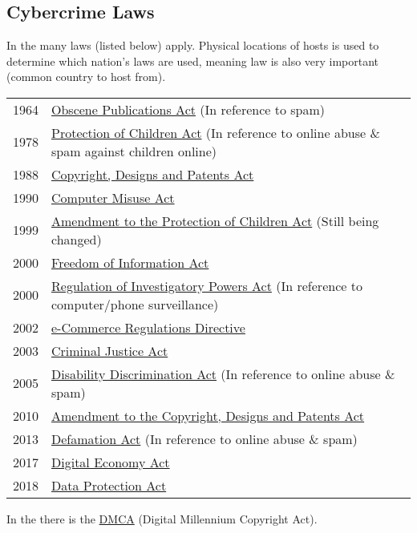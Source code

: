 \documentclass{report}
\begin{document}
        \subsection*{Cybercrime Laws}
            In the  many laws (listed below) apply. Physical locations of hosts is used to determine which nation's laws are used, meaning  law is also very important (common country to host from).
            \begin{center}
                \begin{tabular}{l l}
                    1964 & \href{https://www.legislation.gov.uk/ukpga/1964/74/contents}{Obscene Publications Act} (In reference to spam) \\
                    1978 & \href{https://www.legislation.gov.uk/ukpga/1978/37/contents}{Protection of Children Act} (In reference to online abuse \& spam against children online) \\
                    1988 & \href{https://www.legislation.gov.uk/ukpga/1988/48/contents}{Copyright, Designs and Patents Act} \\
                    1990 & \href{https://www.legislation.gov.uk/ukpga/1990/18/contents}{Computer Misuse Act} \\
                    1999 & \href{https://www.legislation.gov.uk/ukpga/1999/14/contents}{Amendment to the Protection of Children Act} (Still being changed) \\
                    2000 & \href{https://www.legislation.gov.uk/ukpga/2000/36/contents}{Freedom of Information Act} \\
                    2000 & \href{https://www.legislation.gov.uk/ukpga/2000/23/contents}{Regulation of Investigatory Powers Act} (In reference to computer/phone surveillance) \\
                    2002 & \href{https://www.legislation.gov.uk/uksi/2002/2013/made}{e-Commerce Regulations Directive} \\
                    2003 & \href{https://www.legislation.gov.uk/ukpga/2003/44/contents}{Criminal Justice Act} \\
                    2005 & \href{https://www.legislation.gov.uk/ukpga/2005/13/contents}{Disability Discrimination Act} (In reference to online abuse \& spam) \\
                    2010 & \href{https://www.legislation.gov.uk/uksi/2010/2694/contents/made}{Amendment to the Copyright, Designs and Patents Act} \\
                    2013 & \href{https://www.legislation.gov.uk/ukpga/2013/26/contents}{Defamation Act} (In reference to online abuse \& spam) \\
                    2017 & \href{https://www.legislation.gov.uk/ukpga/2017/30/contents}{Digital Economy Act} \\
                    2018 & \href{https://www.legislation.gov.uk/ukpga/2018/12/contents}{Data Protection Act} \\
                \end{tabular}
            \end{center}
            In the  there is the \href{https://www.copyright.gov/dmca/}{DMCA} (Digital Millennium Copyright Act).
\end{document}
